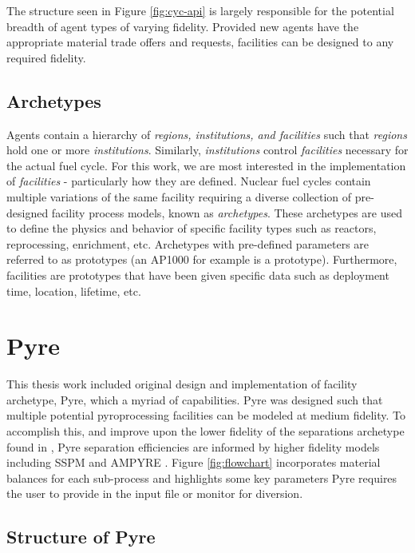 The structure seen in Figure \ref{fig:cyc-api} is largely responsible for the potential breadth of agent types of varying fidelity. Provided new agents have the appropriate material trade offers and requests,
facilities can be designed to any required fidelity.

\subsection{Archetypes}

Agents contain a hierarchy of \emph{regions, institutions, and facilities} such that \emph{regions} hold one or more \emph{institutions}. Similarly, \emph{institutions}
control \emph{facilities} necessary for the actual fuel cycle. For this work, we are most interested in the implementation of \emph{facilities} - particularly how they are defined.
Nuclear fuel cycles contain multiple variations of the same facility requiring a diverse collection of pre-designed facility process models, known as \emph{archetypes}.
These archetypes are used to define the physics and behavior of specific facility types such as reactors, reprocessing, enrichment, etc. Archetypes with pre-defined parameters are referred
to as prototypes (an AP1000 for example is a prototype). Furthermore, facilities are prototypes that have been given specific data such as deployment time, location, lifetime, etc.

\section{Pyre}

This thesis work included original design and implementation of \Cyclus facility archetype, Pyre, which a myriad of capabilities. Pyre was designed such that multiple potential pyroprocessing facilities can be modeled at medium fidelity. To accomplish this, and improve upon
the lower fidelity of the separations archetype found in \Cycamore, Pyre separation efficiencies are informed by higher fidelity models including SSPM and AMPYRE \cite{cipiti_modeling_2012,maggos_update_2015}. Figure \ref{fig:flowchart} incorporates material balances for each sub-process and highlights some key parameters Pyre
requires the user to provide in the input file or monitor for diversion.

\subsection{Structure of Pyre}

